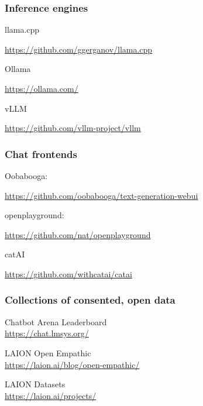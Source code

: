 \documentclass[17pt,aspectratio=169,hyperref={pdfusetitle,colorlinks,allcolors=olive}]{beamer}
\begin{document}
\begin{frame}[fragile]
\frametitle{Inference engines}

llama.cpp

\begin{flushright}
  \url{https://github.com/ggerganov/llama.cpp}
\end{flushright}

Ollama

\begin{flushright}
  \url{https://ollama.com/}
\end{flushright}

vLLM

\begin{flushright}
  \url{https://github.com/vllm-project/vllm}
\end{flushright}


\end{frame}


\begin{frame}[fragile]
\frametitle{Chat frontends}

Oobabooga:
\begin{flushright}
\url{https://github.com/oobabooga/text-generation-webui}
\end{flushright}

openplayground:
\begin{flushright}
\url{https://github.com/nat/openplayground}
\end{flushright}

catAI
\begin{flushright}
\url{https://github.com/withcatai/catai}
\end{flushright}

\end{frame}


\begin{frame}[fragile]
  \frametitle{Collections of consented, open data}

  Chatbot Arena Leaderboard \\
  \url{https://chat.lmsys.org/}

  LAION Open Empathic \\
  \url{https://laion.ai/blog/open-empathic/}

  LAION Datasets \\
  \url{https://laion.ai/projects/}
\end{frame}
\end{document}
